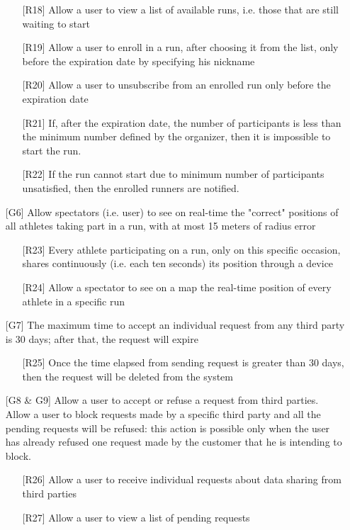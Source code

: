 \begin{itemize}
\begin{itemize}
	\item[{[R18]}] Allow a user to view a list of available runs, i.e. those that are still waiting to start 
	\item[{[R19]}] Allow a user to enroll in a run, after choosing it from the list, only before the expiration date by specifying his nickname
	\item[{[R20]}] Allow a user to unsubscribe from an enrolled run only before the expiration date
	\item[{[R21]}] If, after the expiration date, the number of participants is less than the minimum number defined by the organizer, then it is impossible to start the run.
	\item[{[R22]}] If the run cannot start due to minimum number of participants unsatisfied, then the enrolled runners are notified.
	\end{itemize}
\item[{[G6]}] Allow spectators (i.e. user) to see on real-time the "correct" positions of all athletes taking part in a run, with at most 15 meters of radius error
	\begin{itemize}
	\item[{[R23]}] Every athlete participating on a run, only on this specific occasion, shares continuously (i.e. each ten seconds) its position through a device
	\item[{[R24]}] Allow a spectator to see on a map the real-time position of every athlete in a specific run
	\end{itemize}
\item[{[G7]}] The maximum time to accept an individual request from any third party is 30 days; after that, the request will expire
	\begin{itemize}
	\item[{[R25]}] Once the time elapsed from sending request is greater than 30 days, then the request will be deleted from the system
	\end{itemize}
\item[{[G8 \& G9]}] Allow a user to accept or refuse a request from third parties. Allow a user to block requests made by a specific third party and all the pending requests will be refused: this action is possible only when the user has already refused one request made
by the customer that he is intending to block. 
	\begin{itemize}
	\item[{[R26]}] Allow a user to receive individual requests about data sharing from third parties
	\item[{[R27]}] Allow a user to view a list of pending requests

\end{itemize}
\end{itemize}
